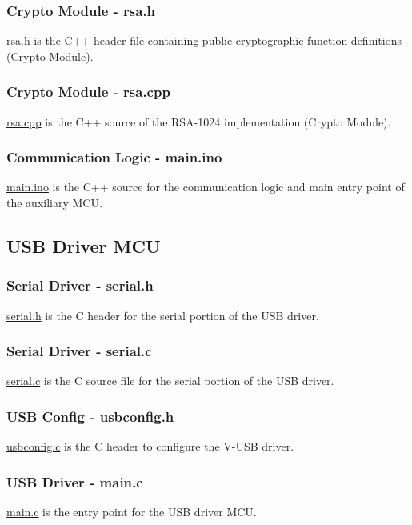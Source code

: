 \subsubsection{Crypto Module - rsa.h}
\label{sec:rsah}
\href{https://github.com/lunarjournal/EEE4022F/blob/main/Firmware/Auxiliary\%20MCU/rsa.h}{rsa.h} is the C++ header file containing public cryptographic function definitions (Crypto Module).
\subsubsection{Crypto Module - rsa.cpp}
\label{sec:rsacpp}
\href{https://github.com/lunarjournal/EEE4022F/blob/main/Firmware/Auxiliary\%20MCU/rsa.cpp}{rsa.cpp} is the C++ source of the RSA-1024 implementation (Crypto Module).
\subsubsection{Communication Logic - main.ino}
\label{sec:comm}
\href{https://github.com/lunarjournal/EEE4022F/blob/main/Firmware/Auxiliary\%20MCU/main.ino}{main.ino} is the C++ source for the communication logic and main entry point of the auxiliary MCU.
\subsection{USB Driver MCU}
\label{sec:usbmcu}
\subsubsection{Serial Driver - serial.h}
\href{https://github.com/lunarjournal/EEE4022F/blob/main/Firmware/USB\%20Driver\%20MCU/USB/serial.h}{serial.h} is the C header for the serial portion of the USB driver.
\subsubsection{Serial Driver - serial.c}
\href{https://github.com/lunarjournal/EEE4022F/blob/main/Firmware/USB\%20Driver\%20MCU/USB/serial.c}{serial.c} is the C source file for the serial portion of the USB driver.
\subsubsection{USB Config - usbconfig.h}
\href{https://github.com/lunarjournal/EEE4022F/blob/main/Firmware/USB\%20Driver\%20MCU/USB/usbconfig.h}{usbconfig.c} is the C header to configure the V-USB driver.
\subsubsection{USB Driver - main.c}
\href{https://github.com/lunarjournal/EEE4022F/blob/main/Firmware/USB\%20Driver\%20MCU/USB/main.c}{main.c} is the entry point for the USB driver MCU.


